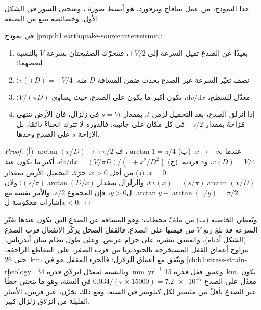 هذا النموذج، من عمل سافاج وبرفورد، هو أبسط صورة ، ومنحنى السور في الشكل الأول. وخصائصه تتبع من الصيغة.

\begin{proposition}\label{prop:b1:earthquake-source:profile}
في نموذج \cref{prop:b1:earthquake-source:interseismic}:
\begin{enumerate}[label=(\alph*)]
  \item بعيدًا عن الصدع تميل السرعة إلى $\pm V/2$، فتتحرّك الصفيحتان بسرعة $V$ بالنسبة لبعضهما؛
  \item نصف تغيّر السرعة عبر الصدع يحدث ضمن المسافة $D$ منه: $v(\pm D) = \pm V/4$؛
  \item معدّل  للسطح، $\mathrm dv/\mathrm dx$، يكون أكبر ما يكون على الصدع، حيث يساوي $V/(\pi D)$؛
  \item إذا انزلق الصدع، بعد التحميل لزمن $t$، بمقدار $s = Vt$ في زلزال، فإن الأرض تنتهي مُزاحةً بمقدار $\pm s/2$ في كل مكان على جانبيه: فالدورة لا تترك انحناءً دائمًا، بل الإزاحة $s$ على الصدع وحدها.
\end{enumerate}
\end{proposition}

\begin{proof}
(أ) $\arctan(x/D) \to \pm\pi/2$ عندما $x \to \pm\infty$. (ب) $\arctan 1 = \pi/4$، ف$v(D) = V/4$، و$v$ فردية. (ج) $\mathrm dv/\mathrm dx = (V/\pi D)/(1 +
x^2/D^2)$، أكبر ما يكون عند $x = 0$. (د) من أجل $x > 0$، حرّك التحميل الأرض بمقدار $t\,v(x) = (s/\pi)\arctan(x/D)$، والزلزال بمقدار $(s/\pi)\arctan(D/x)$؛ ولأن $\arctan y + \arctan(1/y) = \pi/2$ ل$y > 0$، فإن المجموع $s/2$. والأمر نفسه مع إشارات معكوسة ل$x < 0$.
\end{proof}

وتُعطي الخاصية (ب)  من ملفّ محطات: وهو المسافة عن الصدع التي يكون عندها تغيّر السرعة قد بلغ ربع $V$ من قيمتها على الصدع. فالقفل الضحل يركّز الانفعال قرب الصدع (الشكل أدناه)، والعميق ينشره على حزام عريض. وعلى طول نظام سان أندرياس، تتراوح أعماق القفل المستخرجة بالجيوديزيا من قرب الصفر، على المقاطع الزاحفة، حتى \qty{26}{km}، وتتّفق مع أعماق الزلازل: فالجزء المقفل هو  في \cref{ch:b1:stress-strain-rheology}. وبالنسبة لمعدّل انزلاق قدره \qty{34}{mm.yr^{-1}} وعمق قفل قدره \qty{15}{km}، يكون معدّل  على الصدع $\num{0.034}/(\pi\times\num{15000}) = \num{7.2e-7}$ في السنة، وهو ما ينحني خطًّا عبر الصدع بأقلّ من مليمتر لكل كيلومتر في السنة، ومع ذلك يخزّن، عبر قرنين، الأمتار القليلة من انزلاق زلزال كبير.

